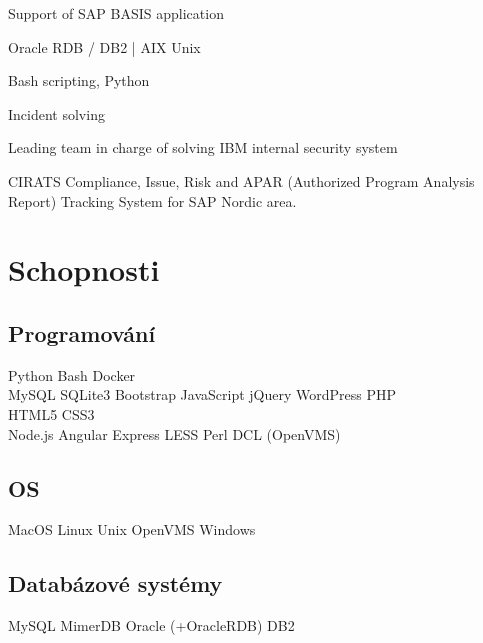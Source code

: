 \documentclass[letterpaper]{deedy-resume.cz} %
\begin{document}
\begin{minipage}[t]{0.60\textwidth}
\begin{tightitemize}
\item Support of SAP BASIS application
\item Oracle RDB / DB2 | AIX Unix
\item Bash scripting, Python
\item Incident solving
\item Leading team in charge of solving IBM internal security system
\item CIRATS Compliance, Issue, Risk and APAR (Authorized Program Analysis Report) Tracking System for SAP Nordic area.
\end{tightitemize}
\sectionspace %

\section{Schopnosti}

\subsection{Programování}
Python \textbullet{} Bash \textbullet{} Docker \\
MySQL \textbullet{} SQLite3 \textbullet{} Bootstrap \textbullet{} JavaScript \textbullet{} jQuery \textbullet{} WordPress \textbullet{} PHP \\
HTML5 \textbullet{} CSS3 \\
Node.js \textbullet{} Angular \textbullet{} Express \textbullet{} LESS \textbullet{} Perl \textbullet{} DCL (OpenVMS) \\
\sectionspace %

\subsection{OS}
MacOS \textbullet{} Linux \textbullet{} Unix \textbullet{} OpenVMS \textbullet{} Windows \\
\sectionspace %

\subsection{Databázové systémy}
MySQL \textbullet{} MimerDB \textbullet{} Oracle (+OracleRDB) \textbullet{} DB2 \\
\sectionspace %


\end{minipage}
\end{document}

